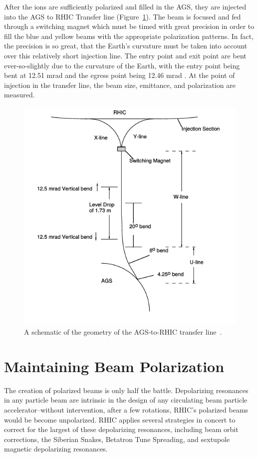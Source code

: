 After the ions are sufficiently polarized and filled in the AGS, they are
injected into the AGS to RHIC Transfer line (Figure~\ref{fig:ags_to_rhic}). The
beam is focused and fed through a switching magnet which must be timed with
great precision in order to fill the blue and yellow beams with the appropriate
polarization patterns. In fact, the precision is so great, that the Earth's
curvature must be taken into account over this relatively short injection line.
The entry point and exit point are bent ever-so-slightly due to the curvature of
the Earth, with the entry point being bent at 12.51 mrad and the egress point
being 12.46 mrad \cite{RHIC2006}.  At the point of injection in the transfer
line, the beam size, emittance, and polarization are measured. 

\begin{figure}
  \centering
  \includegraphics[width=0.6\linewidth]{./figures/ags_to_rhic_transfer}
  \caption{
    A schematic of the geometry of the AGS-to-RHIC transfer line~\cite{RHIC2006}.
  }
  \label{fig:ags_to_rhic}
\end{figure}

\clearpage
\section{Maintaining Beam Polarization}
\label{sec:beam_polarization}

The creation of polarized beams is only half the battle. Depolarizing resonances
in any particle beam are intrinsic in the design of any circulating beam
particle accelerator--without intervention, after a few rotations, RHIC's
polarized beams would be become unpolarized. RHIC applies several strategies in
concert to correct for the largest of these depolarizing resonances, including
beam orbit corrections, the Siberian Snakes, Betatron Tune Spreading, and
sextupole magnetic depolarizing resonances. 

